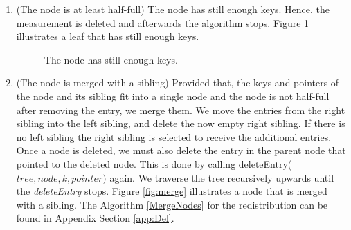 \documentclass[abstracton,12pt,oneside]{scrreprt}
\begin{document}
\begin{enumerate}
	\item (The node is at least half-full) The node has still enough keys. Hence, the measurement is deleted and afterwards the algorithm stops. Figure \ref{fig:enoughkeys} illustrates a leaf that has still enough keys. 
	\begin{figure}[H]
		\centering
		\vspace{2mm}
		\caption{The node has still enough keys.}
		\label{fig:enoughkeys}
	\end{figure} 
			\item (The node is merged with a sibling) Provided that, the keys and pointers of the node and its sibling fit into a single node and the node is not half-full after removing the entry, we merge them. We move the entries from the right sibling into the left sibling, and delete the now empty right sibling. If there is no left sibling the right sibling is selected to receive the additional entries. Once a node is deleted, we must also delete the entry in the parent node that pointed to the deleted node. This is done by calling deleteEntry($tree,node,k,pointer)$ again. We traverse the tree recursively upwards until the \emph{deleteEntry} stops. Figure \ref{fig:merge} illustrates a node that is merged with a sibling. The Algorithm \ref{MergeNodes} for the redistribution can be found in Appendix Section \ref{app:Del}.
			

\end{enumerate}
\end{document}
